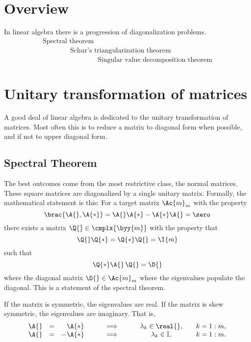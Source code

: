 \section{Overview}

In linear algebra there is a progression of diagonalization problems.
\begin{equation*}
  \begin{array}{lll}
       \text{Spectral theorem}\\
    \qquad  \qquad  \text{Schur's triangularization theorem}\\
    \qquad \qquad \qquad  \qquad  \text{Singular value decomposition theorem}
  \end{array}
\end{equation*}

\section{Unitary transformation of matrices}
A good deal of linear algebra is dedicated to the unitary transformation of matrices. Most often this is to reduce a matrix to diagonal form when possible, and if not to upper diagonal form.

\subsection{Spectral Theorem}
The best outcomes come from the most restrictive class, the normal matrices. These square matrices are diagonalized by a single unitary matrix. Formally, the mathematical statement is this: For a target matrix $\Ac{m}_{m}$ with the property
\begin{equation*}
  \brac{\A{},\A{*}} = \A{}\A{*} - \A{*}\A{} = \zero
\end{equation*}
there exists a matrix $\Q{}\in\cmplx{\byy{m}}$ with the property that
\begin{equation*}
  \Q{}\Q{*} = \Q{*}\Q{} = \I{m}
\end{equation*}
such that
\begin{equation*}
  \Q{*}\A{}\,\Q{} = \D{}
\end{equation*}
where the diagonal matrix $\D{}\in\Ac{m}_{m}$ where the eigenvalues populate the diagonal. This is a statement of the spectral theorem.

If the matrix is symmetric, the eigenvalues are real. If the matrix is skew symmetric, the eigenvalues are imaginary. That is,
\begin{equation}
  \begin{array}{rcrccll}
     \A{} &=& \A{*}  & \qquad \implies & \qquad \lambda_{k} \in \real{}, \quad    & k=1:m, \\
     \A{} &=& -\A{*} & \qquad \implies & \qquad \lambda_{k} \in \mathbb{I}, \quad & k=1:m.
  \end{array}
\end{equation}

